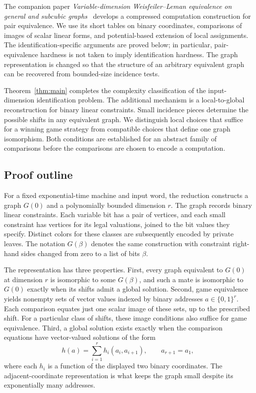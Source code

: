 The companion paper \emph{Variable-dimension Weisfeiler--Leman
equivalence on general and subcubic graphs}~\cite{VariableWL} develops
a compressed computation construction for pair equivalence. We use its
short tables on binary coordinates, comparisons of images of scalar
linear forms, and potential-based extension of local assignments.
The identification-specific arguments are proved below;
in particular, pair-equivalence hardness is not taken to imply
identification hardness. The graph representation is changed so
that the structure of an arbitrary equivalent graph can be recovered
from bounded-size incidence tests.

Theorem~\ref{thm:main} completes the complexity classification of the
input-dimension identification problem. The additional mechanism is a
local-to-global reconstruction for binary linear constraints. Small
incidence pieces determine the possible shifts in any equivalent graph.
We distinguish local choices that suffice for a winning game strategy
from compatible choices that define one graph isomorphism. Both
conditions are established for an abstract family of comparisons before
the comparisons are chosen to encode a computation.

\subsection{Proof outline}

For a fixed exponential-time machine and input word, the reduction
constructs a graph $G(0)$ and a polynomially bounded dimension $r$.
The graph records binary linear constraints. Each variable bit has a
pair of vertices, and each small constraint has vertices for its legal
valuations, joined to the bit values they specify. Distinct colors for
these classes are subsequently encoded by private leaves. The notation
$G(\beta)$ denotes the same construction with constraint right-hand
sides changed from zero to a list of bits $\beta$.

The representation has three properties. First, every graph equivalent
to $G(0)$ at dimension $r$ is isomorphic to some $G(\beta)$, and such
a mate is isomorphic to $G(0)$ exactly when its shifts admit a global
solution. Second, game equivalence yields nonempty sets of vector
values indexed by binary addresses $a\in\{0,1\}^r$. Each comparison
equates just one scalar image of these sets, up to the prescribed
shift. For a particular class of shifts, these image conditions also
suffice for game equivalence. Third, a global solution exists exactly
when the comparison equations have vector-valued solutions of the form
\[
                  h(a)=\sum_{i=1}^r h_i(a_i,a_{i+1}),
                  \qquad a_{r+1}=a_1,
\]
where each $h_i$ is a function of the displayed two binary coordinates.
The adjacent-coordinate representation is what keeps the graph small
despite its exponentially many addresses.

